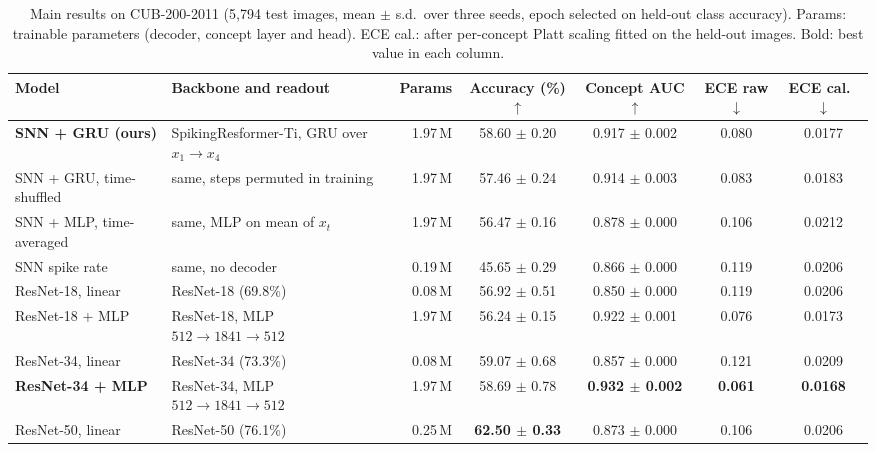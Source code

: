 \documentclass[conference]{IEEEtran}
\begin{document}
\begin{table}[t]
\caption{Main results on CUB-200-2011 (5,794 test images, mean $\pm$ s.d.\ over three seeds, epoch selected on held-out class accuracy). Params: trainable parameters (decoder, concept layer and head). ECE cal.: after per-concept Platt scaling fitted on the held-out images. Bold: best value in each column.}
\label{tab:main}
\centering
\footnotesize
\setlength{\tabcolsep}{5pt}
\begin{tabular}{@{}llrcccc@{}}
\toprule
Model & Backbone and readout & Params & Accuracy (\%) $\uparrow$ & Concept AUC $\uparrow$ & ECE raw $\downarrow$ & ECE cal.\ $\downarrow$ \\
\midrule
\textbf{SNN + GRU (ours)} & SpikingResformer-Ti, GRU over $x_1\!\to\!x_4$ & 1.97\,M & 58.60 $\pm$ 0.20 & 0.917 $\pm$ 0.002 & 0.080 & 0.0177 \\
SNN + GRU, time-shuffled & same, steps permuted in training & 1.97\,M & 57.46 $\pm$ 0.24 & 0.914 $\pm$ 0.003 & 0.083 & 0.0183 \\
SNN + MLP, time-averaged & same, MLP on mean of $x_t$ & 1.97\,M & 56.47 $\pm$ 0.16 & 0.878 $\pm$ 0.000 & 0.106 & 0.0212 \\
SNN spike rate & same, no decoder & 0.19\,M & 45.65 $\pm$ 0.29 & 0.866 $\pm$ 0.000 & 0.119 & 0.0206 \\
\midrule
ResNet-18, linear & ResNet-18 (69.8\%) & 0.08\,M & 56.92 $\pm$ 0.51 & 0.850 $\pm$ 0.000 & 0.119 & 0.0206 \\
ResNet-18 + MLP & ResNet-18, MLP $512\!\to\!1841\!\to\!512$ & 1.97\,M & 56.24 $\pm$ 0.15 & 0.922 $\pm$ 0.001 & 0.076 & 0.0173 \\
ResNet-34, linear & ResNet-34 (73.3\%) & 0.08\,M & 59.07 $\pm$ 0.68 & 0.857 $\pm$ 0.000 & 0.121 & 0.0209 \\
\textbf{ResNet-34 + MLP} & ResNet-34, MLP $512\!\to\!1841\!\to\!512$ & 1.97\,M & 58.69 $\pm$ 0.78 & \textbf{0.932 $\pm$ 0.002} & \textbf{0.061} & \textbf{0.0168} \\
ResNet-50, linear & ResNet-50 (76.1\%) & 0.25\,M & \textbf{62.50 $\pm$ 0.33} & 0.873 $\pm$ 0.000 & 0.106 & 0.0206 \\
\bottomrule
\end{tabular}
\end{table}
\end{document}
